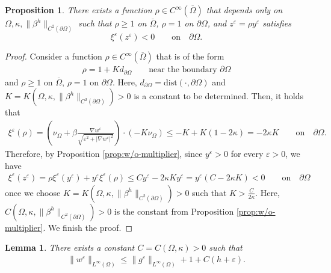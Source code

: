 \documentclass[11pt]{article}
\numberwithin{equation}{section}
\newtheorem{proposition}[theorem]{Proposition}
\newtheorem{lemma}[theorem]{Lemma}
\newcommand{\pOmega}[0]{\partial\Omega}
\def\le{\leqslant}
\def\leq{\leqslant}
\def\geq{\geqslant}
\begin{document}
\begin{proposition}\label{prop:multiplier}
There exists a function $\rho\in C^{\infty}(\overline{\Omega})$ that depends only on $\Omega,\kappa,\|\beta^h\|_{C^2(\partial\Omega)}$ such that $\rho\geq1$ on $\overline{\Omega}$, $\rho=1$ on $\partial\Omega$, and $z^{\varepsilon}=\rho y^{\varepsilon}$ satisfies
\begin{equation*}
\xi^\varepsilon(z^{\varepsilon})<0\qquad\text{on}\quad\pOmega.
\end{equation*}
\end{proposition}
\begin{proof}
Consider a function $\rho\in C^{\infty}(\overline{\Omega})$ that is of the form
\begin{align*}
\rho = 1 + Kd_{\partial\Omega}\qquad\text{near the boundary }\partial\Omega
\end{align*}
and $\rho\geq1$ on $\overline{\Omega}$, $\rho=1$ on $\partial\Omega$. Here, $d_{\partial\Omega}=\mathrm{dist}(\cdot,\partial\Omega)$ and $K=K(\Omega,\kappa,\|\beta^h\|_{C^2(\partial\Omega)})>0$ is a constant to be determined. Then, it holds that
\begin{align*}
\xi^\varepsilon(\rho) = \left(\nu_{\Omega}+\beta\frac{\nabla w^{\varepsilon}}{\sqrt{\varepsilon^2+|\nabla w^{\varepsilon}|^2}}\right) \cdot \left(-K\nu_{\Omega}\right) \leq -K + K(1-2\kappa) = -2\kappa K\qquad\text{on}\quad\partial\Omega.
\end{align*}
Therefore, by Proposition \ref{prop:w/o-multiplier}, since $y^\varepsilon > 0$ for every $\varepsilon > 0$, we have
\begin{align*}
\xi^\varepsilon(z^{\varepsilon}) = \rho \xi^\varepsilon(y^{\varepsilon}) + y^{\varepsilon} \xi^\varepsilon(\rho)  \leq Cy^{\varepsilon} - 2\kappa K y^{\varepsilon} = y^{\varepsilon}(C-2\kappa K)<0\qquad\text{on}\quad\partial\Omega
\end{align*}
once we choose $K=K(\Omega,\kappa,\|\beta^h\|_{C^2(\partial\Omega)})>0$ such that $K>\frac{C}{2\kappa}$. Here, $C(\Omega,\kappa,\|\beta^h\|_{C^2(\partial\Omega)})>0$ is the constant from Proposition \ref{prop:w/o-multiplier}. We finish the proof.
\end{proof}


\begin{lemma}\label{lem:L-infty-estimate}
There exists a constant $C=C(\Omega,\kappa)>0$ such that %
\begin{align*}
\|w^{\varepsilon}\|_{L^\infty(\Omega)} \leqslant \|g^{\varepsilon}\|_{L^\infty(\Omega)} + 1 + C(h+\varepsilon).
\end{align*}
\end{lemma}
\end{document}
